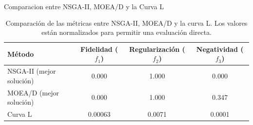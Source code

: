 \documentclass[aspectratio=169,xcolor=dvipsnames]{beamer}
\begin{document}
\begin{frame}{Comparacion entre NSGA-II, MOEA/D y la Curva L}

    \begin{table}[h]
        \centering
        \begin{tabular}{lccc}
            \toprule
            \textbf{Método} & \textbf{Fidelidad (\( f_1 \))} & \textbf{Regularización (\( f_2 \))} & \textbf{Negatividad (\( f_3 \))} \\
            \midrule
            NSGA-II (mejor solución) & 0.000 & 1.000 & 0.000 \\
            MOEA/D (mejor solución) & 0.000 & 1.000 & 0.347 \\
            Curva L & 0.00063 & 0.0071 & 0.0001 \\
            \bottomrule
        \end{tabular}
        \caption{Comparación de las métricas entre NSGA-II, MOEA/D y la curva L. Los valores están normalizados para permitir una evaluación directa.}
        \label{tab:comparison_algorithms}
    \end{table}
    
\end{frame}
\end{document}
